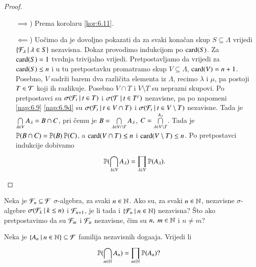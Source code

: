 \begin{proof}
    \begin{enumerate}
        \item[$\implies$)] Prema korolaru \ref{kor:6.11}.
        \item[$\impliedby$)] Uo\v cimo da je dovoljno pokazati da za svaki kona\v can skup $S \subseteq \Lambda$ vrijedi $\{{\mathcal{F}_\lambda} \: | \: {\lambda \in S}\}$ nezavisna.
        Dokaz provodimo indukcijom po $\textnormal{card}({S})$.
        Za $\textnormal{card}({S}) = 1$ tvrdnja trivijalno vrijedi.
        Pretpostavljamo da vrijedi za $\textnormal{card}({S}) \leq n$ i u tu pretpostavku promatramo skup $V \subseteq \Lambda$, $\textnormal{card}({V}) = n + 1$.
        Posebno, $V$ sadr\v zi barem dva razli\v cita elementa iz $\Lambda$, recimo $\lambda$ i $\mu$, pa postoji $T \in \mathcal{T}$ koji ih razlikuje.
        Posebno $V \cap T$ i $V \setminus T$ su neprazni skupovi.
        Po pretpostavci su $\sigma({\mathcal{F}_t} \: | \: {t \in T})$ i $\sigma({\mathcal{T}} \: | \: {t \in T^c})$ nezavisne, pa po napomeni \ref{nap:6.9}  \ref{nap:6.9d} su $\sigma({\mathcal{F}_t} \: | \: {t \in V \cap T})$ i $\sigma({\mathcal{F}_t} \: | \: {t \in V \setminus T})$ nezavisne.
        Tada je $\bigcap\limits_{\lambda \in V}^{} A_\lambda = B \cap C$, pri \v cemu je $B = \bigcap\limits_{\lambda \in V \cap T}^{} A_\lambda$, $C = \bigcap\limits_{\lambda \in V \setminus T}^{A_\lambda}$.
        Tada je $\mathbb{P}({B \cap C}) = \mathbb{P}({B}) \: \mathbb{P}({C})$, a $\textnormal{card}({V \cap T}) \leq n$ i $\textnormal{card}({V \setminus T}) \leq n$.
        Po pretpostavci indukcije dobivamo
        \begin{equation*}
            \mathbb{P}({\bigcap\limits_{\lambda \in V}^{} A_\lambda}) = \prod\limits_{\lambda \in V}^{} \mathbb{P}({A_\lambda}).
        \end{equation*}
    \end{enumerate}
\end{proof}

\begin{zad} \label{zad:6.13}
    Neka je $\mathcal{F}_n \subseteq \mathcal{F}$ $\sigma$-algebra, za svaki $n \in \mathbb{N}$.
    Ako su, za svaki $n \in \mathbb{N}$, nezavisne $\sigma$-algebre $\sigma({\mathcal{F}_k} \: | \: {k \leq n})$ i $\mathcal{F}_{n + 1}$, je li tada i $\{{\mathcal{F}_n} \: | \: {n \in \mathbb{N}}\}$ nezavisna?
    \v Sto ako pretpostavimo da su $\mathcal{F}_m$ i $\mathcal{F}_n$ nezavisne, \v cim su $n, \; m \in \mathbb{N}$ i $n \neq m$?
\end{zad}

\begin{zad} \label{zad:6.14}
    Neka je $\{{A_n} \: | \: {n \in \mathbb{N}}\} \subseteq \mathcal{F}$ familija nezavisnih doga\dj aja.
    Vrijedi li
    \begin{equation*}
        \mathbb{P}({\bigcap\limits_{n \in \mathbb{N}}^{} A_n}) = \prod\limits_{n \in \mathbb{N}}^{} \mathbb{P}({A_n})?
    \end{equation*}
\end{zad}